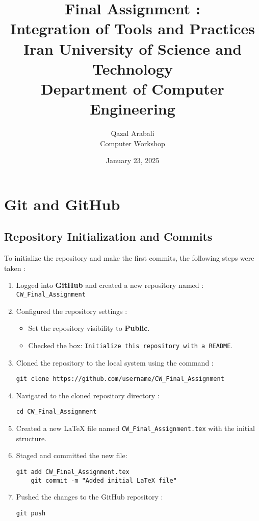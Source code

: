 \documentclass[12pt]{article}
\title{
    \vspace{2in}
    \textbf{Final Assignment :}\\
    \textbf{Integration of Tools and Practices}\\
    \large Iran University of Science and Technology\\
    \large Department of Computer Engineering\\
    \vspace{2in}
}
\author{
    \vspace{0.5in}
    Qazal Arabali\\
    Computer Workshop\\
    \vspace{0.5in}
}
\date{January 23, 2025}
\begin{document}
\begin{titlepage}
    \maketitle
    \thispagestyle{empty}
\end{titlepage}

\newpage

\tableofcontents
\newpage

\section{Git and GitHub}
    \subsection{Repository Initialization and Commits}
    
To initialize the repository and make the first commits, the following steps were taken :

\begin{enumerate}
    \item Logged into \textbf{GitHub} and created a new repository named :
    \texttt{CW\_Final\_Assignment}
    
    \item Configured the repository settings :
    \begin{itemize}
        \item Set the repository visibility to \textbf{Public}.
        \item Checked the box: \texttt{Initialize this repository with a README}.
    \end{itemize}

    \item Cloned the repository to the local system using the command :
    \begin{lstlisting}[caption=Clone Repository]
    git clone https://github.com/username/CW_Final_Assignment
    \end{lstlisting}

    \item Navigated to the cloned repository directory :
    \begin{lstlisting}[caption=Navigate to Directory]
    cd CW_Final_Assignment
    \end{lstlisting}

    \item Created a new LaTeX file named \texttt{CW\_Final\_Assignment.tex} with the initial structure.

    \item Staged and committed the new file:
    \begin{lstlisting}[caption=Stage and Commit Changes]
    git add CW_Final_Assignment.tex
    git commit -m "Added initial LaTeX file"
    \end{lstlisting}

    \item Pushed the changes to the GitHub repository :
    \begin{lstlisting}[caption=Push Changes]
    git push
    \end{lstlisting}
\end{enumerate}
\end{document}
